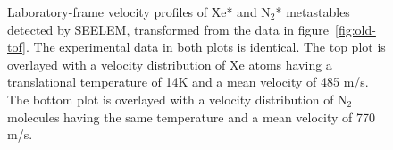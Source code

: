 \documentclass[12pt]{mitthesis}
\begin{document}
\begin{figure}
  \caption{Laboratory-frame velocity profiles of Xe* and N$_2$*
    metastables detected by SEELEM, transformed from the data in
    figure~\ref{fig:old-tof}.  The experimental data in both plots is
    identical.  The top plot is overlayed with a velocity distribution
    of Xe atoms having a translational temperature of 14K and a mean
    velocity of 485 m/s.  The bottom plot is overlayed with a velocity
    distribution of N$_2$ molecules having the same temperature and a
    mean velocity of 770 m/s.}
  \label{fig:old-velocity}
  \centering
\end{figure}
\end{document}
